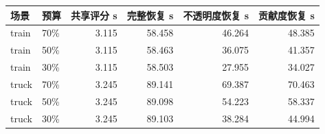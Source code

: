 \begin{center}
\small
\begin{tabular}{llrrrr}
\toprule
场景 & 预算 & 共享评分 s & 完整恢复 s & 不透明度恢复 s & 贡献度恢复 s \\
\midrule
train & 70\% & 3.115 & 58.458 & 46.264 & 48.385 \\
train & 50\% & 3.115 & 58.463 & 36.075 & 41.357 \\
train & 30\% & 3.115 & 58.503 & 27.955 & 34.027 \\
truck & 70\% & 3.245 & 89.141 & 69.387 & 70.463 \\
truck & 50\% & 3.245 & 89.098 & 54.223 & 58.337 \\
truck & 30\% & 3.245 & 89.103 & 38.284 & 44.994 \\
\bottomrule
\end{tabular}
\end{center}
